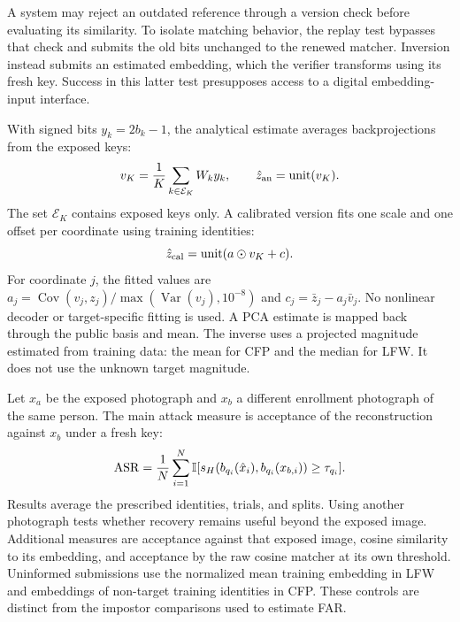 A system may reject an outdated reference through a version check before evaluating its similarity. To isolate matching behavior, the replay test bypasses that check and submits the old bits unchanged to the renewed matcher. Inversion instead submits an estimated embedding, which the verifier transforms using its fresh key. Success in this latter test presupposes access to a digital embedding-input interface.


With signed bits $y_k=2b_k-1$, the analytical estimate averages backprojections from the exposed keys:
\begin{equation}
 v_K=\frac{1}{K}\sum_{k\in\mathcal{E}_K}W_k y_k,
 \qquad \hat z_{\mathrm{an}}=\operatorname{unit}(v_K).
\end{equation}
The set $\mathcal{E}_K$ contains exposed keys only. A calibrated version fits one scale and one offset per coordinate using training identities:
\begin{equation}
 \hat z_{\mathrm{cal}}=\operatorname{unit}(a\odot v_K+c).
\end{equation}
For coordinate $j$, the fitted values are $a_j=\operatorname{Cov}(v_j,z_j)/\max(\operatorname{Var}(v_j),10^{-8})$ and $c_j=\bar z_j-a_j\bar v_j$. No nonlinear decoder or target-specific fitting is used. A PCA estimate is mapped back through the public basis and mean. The inverse uses a projected magnitude estimated from training data: the mean for CFP and the median for LFW. It does not use the unknown target magnitude.

Let $x_a$ be the exposed photograph and $x_b$ a different enrollment photograph of the same person. The main attack measure is acceptance of the reconstruction against $x_b$ under a fresh key:
\begin{equation}
 \operatorname{ASR}=\frac{1}{N}\sum_{i=1}^{N}\mathbb{I}
 [s_H(b_{q_i}(\hat x_i),b_{q_i}(x_{b,i}))\geq\tau_{q_i}].
\end{equation}
Results average the prescribed identities, trials, and splits. Using another photograph tests whether recovery remains useful beyond the exposed image. Additional measures are acceptance against that exposed image, cosine similarity to its embedding, and acceptance by the raw cosine matcher at its own threshold. Uninformed submissions use the normalized mean training embedding in LFW and embeddings of non-target training identities in CFP. These controls are distinct from the impostor comparisons used to estimate FAR.




